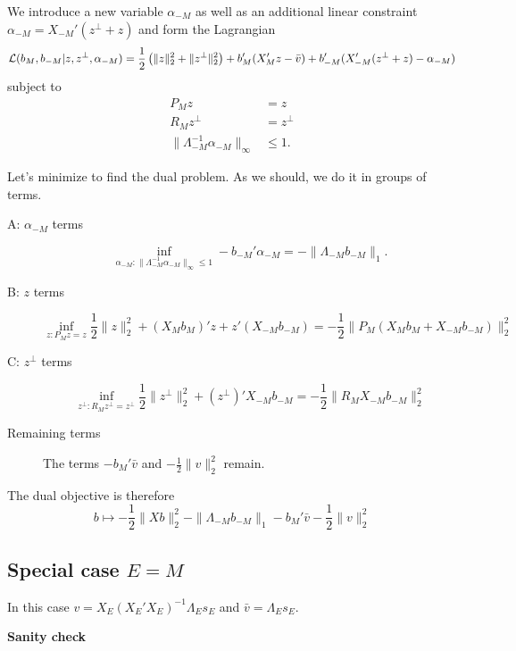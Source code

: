 \documentclass{article}
\begin{document}
          We introduce a new variable $\alpha_{-M}$ as well as an additional linear constraint $\alpha_{-M}=X_{-M}'(z^{\perp}+z)$ and form the Lagrangian
          $${\cal L}(b_M, b_{-M}|z,z^{\perp},\alpha_{-M}) = \frac{1}{2} \left(\|z\|^2_2 + \|z^{\perp}\|^2_2 \right) + b_M'(X_M'z-\bar{v}) + b_{-M}'(X_{-M}'(z^{\perp}+z) - \alpha_{-M})
          $$
          subject to
          $$
          \begin{aligned}
            P_Mz &= z \\
            R_Mz^{\perp} &= z^{\perp} \\
            \|\Lambda_{-M}^{-1}\alpha_{-M}\|_{\infty} &\leq 1.
            \end{aligned}
          $$

          Let's minimize to find the dual problem. As we should, we do it in groups of terms.
          \begin{description}
            \item[A: $\alpha_{-M}$ terms]
            $$\inf_{\alpha_{-M}: \|\Lambda_{-M}^{-1}\alpha_{-M}\|_{\infty} \leq 1} -b_{-M}'\alpha_{-M} = -\|\Lambda_{-M}b_{-M}\|_1.
              $$
            \item[B: $z$ terms]
              $$
              \inf_{z:P_Mz=z} \frac{1}{2} \|z\|^2_2 + (X_Mb_M)'z + z'(X_{-M}b_{-M}) = -\frac{1}{2}\|P_M(X_Mb_M + X_{-M}b_{-M})\|^2_2
              $$
            \item[C: $z^{\perp}$ terms]
              $$
              \inf_{z^{\perp}: R_Mz^{\perp}=z^{\perp}} \frac{1}{2}\|z^{\perp}\|^2_2 + (z^{\perp})'X_{-M}b_{-M} = -\frac{1}{2} \|R_MX_{-M}b_{-M}\|^2_2
              $$
            \item[Remaining terms]
              The terms $-b_M'\bar{v}$ and $ - \frac{1}{2} \|v\|^2_2$ remain.
          \end{description}

          The dual objective is therefore
          $$
          b \mapsto -\frac{1}{2}\|Xb\|^2_2 - \|\Lambda_{-M}b_{-M}\|_1 - b_M'\bar{v} - \frac{1}{2} \|v\|^2_2
          $$

          \subsection{          Special case $E=M$ }

          In this case $v=X_E(X_E'X_E)^{-1}\Lambda_Es_E$ and $\bar{v}=\Lambda_Es_E$.

          {\bf Sanity check}
\end{document}
